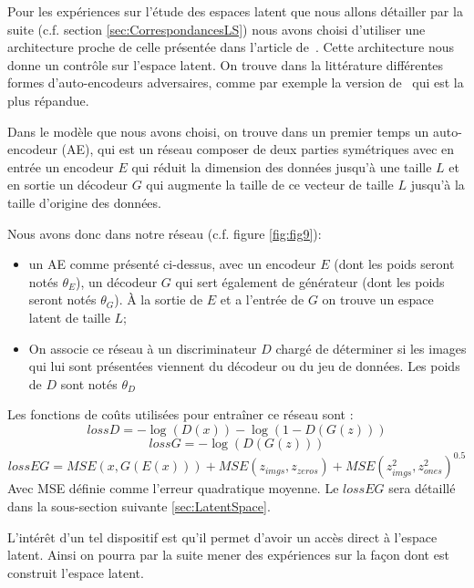 \documentclass[11pt,francais]{article}
\begin{document}
Pour les expériences sur l'étude des espaces latent que nous allons détailler par la suite (c.f. section \ref{sec:CorrespondancesLS}) nous avons choisi d'utiliser une architecture proche de celle présentée dans l'article de~\cite{GADAE}. Cette architecture nous donne un contrôle sur l'espace latent.
On trouve dans la littérature différentes formes d'auto-encodeurs adversaires, comme par exemple la version de~\cite{makhzani2015adversarial} qui est la plus répandue.

Dans le modèle que nous avons choisi, on trouve dans un premier temps un auto-encodeur (AE), qui est un réseau composer de deux parties symétriques avec en entrée un encodeur \(E\) qui réduit la dimension des données jusqu'à une taille \(L\) et en sortie un décodeur \(G\) qui augmente la taille de ce vecteur de taille \(L\) jusqu'à la taille d'origine des données. 

Nous avons donc dans notre réseau (c.f. figure \ref{fig:fig9}):
\begin{itemize}
  \item un AE comme présenté ci-dessus, avec un encodeur \(E\) (dont les poids seront notés \(\theta_E\)), un décodeur \(G\) qui sert également de générateur (dont les poids seront notés \(\theta_G\)). À la sortie de \(E\) et a l'entrée de \(G\) on trouve un espace latent de taille \(L\);
  \item On associe ce réseau à un discriminateur \(D\) chargé de déterminer si les images qui lui sont présentées viennent du décodeur ou du jeu de données. Les poids de \(D\) sont notés \(\theta_D\) 
\end{itemize}
Les fonctions de coûts utilisées pour entraîner ce réseau sont :
\[
lossD = -\log(D(x)) - \log(1-D(G(z)))
\]
\[
lossG = -\log(D(G(z)))
\]
\[
lossEG = MSE(x, G(E(x))) + MSE(z_{imgs}, z_{zeros}) + MSE(z_{imgs}^2, z_{ones}^2)^{0.5}
\]
Avec MSE définie comme l'erreur quadratique moyenne.
Le \(lossEG\) sera détaillé dans la sous-section suivante \ref{sec:LatentSpace}.

L'intérêt d'un tel dispositif est qu'il permet d'avoir un accès direct à l'espace latent. Ainsi on pourra par la suite mener des expériences sur la façon dont est construit l'espace latent.
\end{document}
